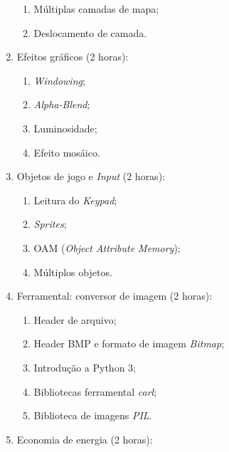 \documentclass{article}
\begin{document}
\begin{enumerate}
\begin{samepage}
\begin{enumerate}
                \item Múltiplas camadas de mapa;
                \item Deslocamento de camada.
        \end{enumerate}
        \end{samepage}
    \item Efeitos gráficos (2 horas):
        \begin{samepage}
        \begin{enumerate}
                \item \textit{Windowing};
                \item \textit{Alpha-Blend};
                \item Luminosidade;
                \item Efeito mosáico.
        \end{enumerate}
        \end{samepage}
    \item Objetos de jogo e \textit{Input} (2 horas):
        \begin{samepage}
        \begin{enumerate}
                \item Leitura do \textit{Keypad};
                \item \textit{Sprites};
                \item OAM (\textit{Object Attribute Memory});
                \item Múltiplos objetos.
        \end{enumerate}
        \end{samepage}
    \item Ferramental: conversor de imagem (2 horas):
        \begin{samepage}
        \begin{enumerate}
                \item Header de arquivo;
                \item Header BMP e formato de imagem \textit{Bitmap};
                \item Introdução a Python 3;
                \item Bibliotecas ferramental \textit{carl};
                \item Biblioteca de imagens \textit{PIL}.
        \end{enumerate}
        \end{samepage}
    \item Economia de energia (2 horas):
        \begin{samepage}

\end{samepage}
\end{enumerate}
\end{document}
